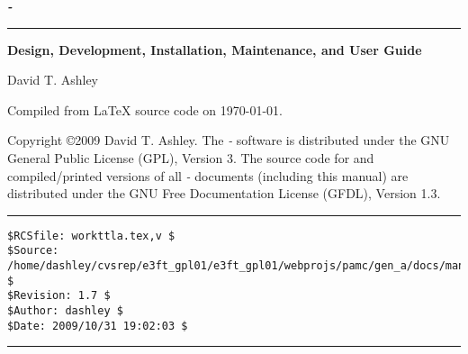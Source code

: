 
\thispagestyle{empty}

\begin{flushright}
\vspace*{15mm}
\Huge\bfseries
\emph{\productbasename{}-\productversion{}}\\
\end{flushright}
\vspace{0.0cm}
\noindent\rule{\textwidth}{2pt}
\begin{flushright}
\huge\bfseries
Design, Development, Installation, Maintenance, and User Guide
\end{flushright}
\vfill
\begin{flushright}
\begin{small}
David T. Ashley
\end{small}
\end{flushright}
\vspace{0.2cm}
\begin{flushright}
\begin{small}
Compiled from \LaTeX{} source code on \today .  
\end{small}
\end{flushright}

\pagebreak
\thispagestyle{empty}
\begin{small}
\noindent Copyright \copyright 2009 David T. Ashley.
The \emph{\productbasename{}-\productversion{}}
software is distributed under the GNU General Public License (GPL), Version 3\@.
The source code for and compiled/printed versions of 
all \emph{\productbasename{}-\productversion{}} documents
(including this manual)
are distributed under the GNU Free Documentation License (GFDL), Version 1.3\@.
\end{small}

\vfill

\noindent\begin{minipage}{\textwidth}
\noindent\rule[-0.25in]{\textwidth}{1pt}
\begin{tiny}
\begin{verbatim}
$RCSfile: workttla.tex,v $
$Source: /home/dashley/cvsrep/e3ft_gpl01/e3ft_gpl01/webprojs/pamc/gen_a/docs/manual/man_a/comps/workttla.tex,v $
$Revision: 1.7 $
$Author: dashley $
$Date: 2009/10/31 19:02:03 $
\end{verbatim}
\end{tiny}
\noindent\rule[0.25in]{\textwidth}{1pt}
\end{minipage}

%
%
%
%
%
%
%
